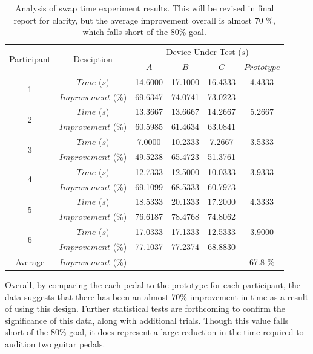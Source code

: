 \documentclass{article}
\begin{document}
	\begin{table}
	\begin{center}
	\begin{tabular}{ |c|c|c c c c| }
	\hline
	\multirow{2}{*}{Participant} 	&\multirow{2}{*}{Desciption}& \multicolumn{4}{|c|}{Device Under Test ($s$)} \\
									& & $A$ & $B$ & $C$ & $Prototype$ \\
	\hline
	 \multirow{2}{*}{1} & $Time$ ($s$) & 14.6000 & 17.1000 & 16.4333 &  4.4333 \\
	 					& $Improvement$ (\%) 	 & 69.6347 & 74.0741 & 73.0223 &  		 \\
	 \hline
	 \multirow{2}{*}{2} & $Time$ ($s$) & 13.3667 & 13.6667 & 14.2667 &  5.2667 \\
	 					& $Improvement$ (\%)   & 60.5985 & 61.4634 & 63.0841 &  		 \\
	 \hline
	 \multirow{2}{*}{3} & $Time$ ($s$) &  7.0000 & 10.2333 &  7.2667 &  3.5333 \\
	 					& $Improvement$ (\%) 	 & 49.5238 & 65.4723 & 51.3761 & 		 \\
	 \hline
	 \multirow{2}{*}{4} & $Time$ ($s$) & 12.7333 & 12.5000 & 10.0333 &  3.9333 \\
	 					& $Improvement$ (\%)   & 69.1099 & 68.5333 & 60.7973 & 		 \\
	 \hline
	 \multirow{2}{*}{5} & $Time$ ($s$) & 18.5333 & 20.1333 & 17.2000 &  4.3333 \\
	 					& $Improvement$ (\%)   & 76.6187 & 78.4768 & 74.8062 & 	  	 \\
	 \hline
	 \multirow{2}{*}{6} & $Time$ ($s$) & 17.0333 & 17.1333 & 12.5333 &  3.9000 \\
	 					& $Improvement$ (\%)   & 77.1037 & 77.2374 & 68.8830 & 		 \\
	\hline
	Average 			& $Improvement$ (\%) & & & & 67.8 \% \\
	\hline
	\end{tabular}
	\caption{Analysis of swap time experiment results.  This will be revised in final report for clarity, but the average improvement overall is almost 70 \%, which falls short of the 80\% goal.}
	\label{tab:SwapTestAnalysis}
	\end{center}
	\end{table}

	Overall, by comparing the each pedal to the prototype for each participant, the data suggests that there has been an almost 70\% improvement in time as a result of using this design.  Further statistical tests are forthcoming to confirm the significance of this data, along with additional trials.  Though this value falls short of the 80\% goal, it does represent a large reduction in the time required to audition two guitar pedals.
\end{document}
